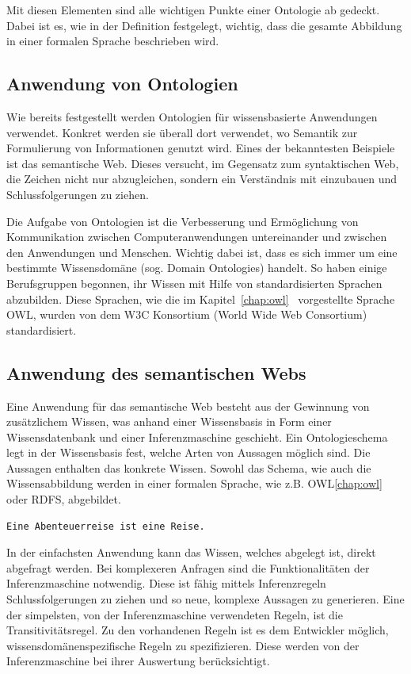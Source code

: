 Mit diesen Elementen sind alle wichtigen Punkte einer Ontologie ab gedeckt. Dabei ist es, wie in der Definition festgelegt, wichtig, dass die gesamte Abbildung in einer formalen Sprache beschrieben wird.

\subsection{Anwendung von Ontologien}
\label{subsec:ontologien_onto_anwendung}
Wie bereits festgestellt werden Ontologien für wissensbasierte Anwendungen verwendet. Konkret werden sie überall dort verwendet, wo Semantik zur Formulierung von Informationen genutzt wird. Eines der bekanntesten Beispiele ist das semantische Web. Dieses versucht, im Gegensatz zum syntaktischen Web, die Zeichen nicht nur abzugleichen, sondern ein Verständnis mit einzubauen und Schlussfolgerungen zu ziehen.

Die Aufgabe von Ontologien ist die Verbesserung und Ermöglichung von Kommunikation zwischen Computeranwendungen untereinander und zwischen den Anwendungen und Menschen. Wichtig dabei ist, dass es sich immer um eine bestimmte Wissensdomäne (sog. Domain Ontologies) handelt. So haben einige Berufsgruppen begonnen, ihr Wissen mit Hilfe von standardisierten Sprachen abzubilden. Diese Sprachen, wie die im Kapitel~\ref{chap:owl}~ vorgestellte Sprache OWL, wurden von dem W3C Konsortium (World Wide Web Consortium) standardisiert.

\subsection{Anwendung des semantischen Webs}
\label{subsec:ontologien_onto_SemantikWebAnwendung}
Eine Anwendung für das semantische Web besteht aus der Gewinnung von zusätzlichem Wissen, was anhand einer Wissensbasis in Form einer Wissensdatenbank und einer Inferenzmaschine geschieht. Ein Ontologieschema legt in der Wissensbasis fest, welche Arten von Aussagen möglich sind. Die Aussagen enthalten das konkrete Wissen. Sowohl das Schema, wie auch die Wissensabbildung werden in einer formalen Sprache, wie z.B. OWL\ref{chap:owl} oder RDFS, abgebildet.

\begin{lstlisting}[caption={Beispiel einer Aussage in einer Wissensbasis.}]
Eine Abenteuerreise ist eine Reise.
\end{lstlisting}

In der einfachsten Anwendung kann das Wissen, welches abgelegt ist, direkt abgefragt werden. Bei komplexeren Anfragen sind die Funktionalitäten der Inferenzmaschine notwendig. Diese ist fähig mittels Inferenzregeln Schlussfolgerungen zu ziehen und so neue, komplexe Aussagen zu generieren. Eine der simpelsten, von der Inferenzmaschine verwendeten Regeln, ist die Transitivitätsregel. Zu den vorhandenen Regeln ist es dem Entwickler möglich, wissensdomänenspezifische Regeln zu spezifizieren. Diese werden von der Inferenzmaschine bei ihrer Auswertung berücksichtigt.



